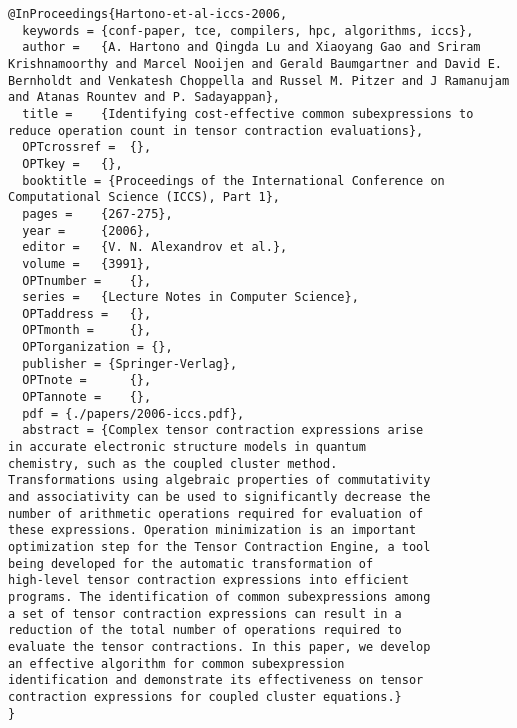 \documentclass[11pt]{article}
\begin{document}
\begin{lstlisting}
@InProceedings{Hartono-et-al-iccs-2006,
  keywords = {conf-paper, tce, compilers, hpc, algorithms, iccs},
  author = 	 {A. Hartono and Qingda Lu and Xiaoyang Gao and Sriram Krishnamoorthy and Marcel Nooijen and Gerald Baumgartner and David E. Bernholdt and Venkatesh Choppella and Russel M. Pitzer and J Ramanujam and Atanas Rountev and P. Sadayappan},
  title = 	 {Identifying cost-effective common subexpressions to reduce operation count in tensor contraction evaluations},
  OPTcrossref =  {},
  OPTkey = 	 {},
  booktitle = {Proceedings of the International Conference on Computational Science (ICCS), Part 1},
  pages = 	 {267-275},
  year = 	 {2006},
  editor = 	 {V. N. Alexandrov et al.},
  volume = 	 {3991},
  OPTnumber = 	 {},
  series = 	 {Lecture Notes in Computer Science},
  OPTaddress = 	 {},
  OPTmonth = 	 {},
  OPTorganization = {},
  publisher = {Springer-Verlag},
  OPTnote = 	 {},
  OPTannote = 	 {},
  pdf = {./papers/2006-iccs.pdf},
  abstract = {Complex tensor contraction expressions arise
in accurate electronic structure models in quantum
chemistry, such as the coupled cluster method.
Transformations using algebraic properties of commutativity
and associativity can be used to significantly decrease the
number of arithmetic operations required for evaluation of
these expressions. Operation minimization is an important
optimization step for the Tensor Contraction Engine, a tool
being developed for the automatic transformation of
high-level tensor contraction expressions into efficient
programs. The identification of common subexpressions among
a set of tensor contraction expressions can result in a
reduction of the total number of operations required to
evaluate the tensor contractions. In this paper, we develop
an effective algorithm for common subexpression
identification and demonstrate its effectiveness on tensor
contraction expressions for coupled cluster equations.}  
}


\end{lstlisting}
\end{document}

